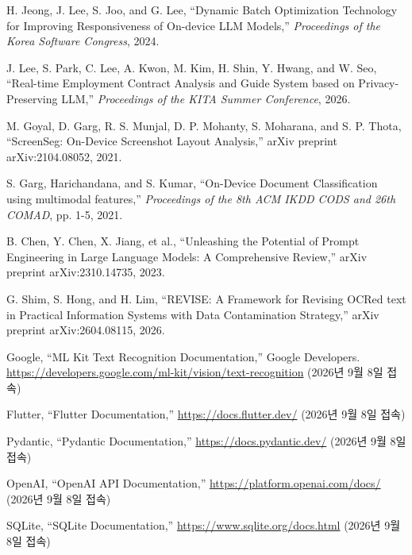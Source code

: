 \documentclass[11pt,a4paper]{article}
\begin{document}
\begin{enumerate}[label={[\arabic*]}]
    \item\label{ref_ondevice_llm} H. Jeong, J. Lee, S. Joo, and G. Lee,
    ``Dynamic Batch Optimization Technology for Improving Responsiveness of On-device LLM Models,''
    \textit{Proceedings of the Korea Software Congress}, 2024.

    \item\label{ref_privacy_llm} J. Lee, S. Park, C. Lee, A. Kwon, M. Kim, H. Shin, Y. Hwang, and W. Seo,
    ``Real-time Employment Contract Analysis and Guide System based on Privacy-Preserving LLM,''
    \textit{Proceedings of the KITA Summer Conference}, 2026.

    \item\label{ref_screenseg} M. Goyal, D. Garg, R. S. Munjal, D. P. Mohanty, S. Moharana, and S. P. Thota,
    ``ScreenSeg: On-Device Screenshot Layout Analysis,''
    arXiv preprint arXiv:2104.08052, 2021.

    \item\label{ref_ondevice_classification} S. Garg, Harichandana, and S. Kumar,
    ``On-Device Document Classification using multimodal features,''
    \textit{Proceedings of the 8th ACM IKDD CODS and 26th COMAD}, pp. 1-5, 2021.

    \item\label{ref_prompt_engineering} B. Chen, Y. Chen, X. Jiang, et al.,
    ``Unleashing the Potential of Prompt Engineering in Large Language Models: A Comprehensive Review,''
    arXiv preprint arXiv:2310.14735, 2023.

    \item\label{ref_revise} G. Shim, S. Hong, and H. Lim,
    ``REVISE: A Framework for Revising OCRed text in Practical Information Systems with Data Contamination Strategy,''
    arXiv preprint arXiv:2604.08115, 2026.

    \item\label{ref_mlkit} Google,
    ``ML Kit Text Recognition Documentation,''
    Google Developers.
    \url{https://developers.google.com/ml-kit/vision/text-recognition} (2026년 9월 8일 접속)

    \item\label{ref_flutter} Flutter,
    ``Flutter Documentation,''
    \url{https://docs.flutter.dev/} (2026년 9월 8일 접속)

    \item\label{ref_pydantic} Pydantic,
    ``Pydantic Documentation,''
    \url{https://docs.pydantic.dev/} (2026년 9월 8일 접속)

    \item\label{ref_openai} OpenAI,
    ``OpenAI API Documentation,''
    \url{https://platform.openai.com/docs/} (2026년 9월 8일 접속)

    \item\label{ref_sqlite} SQLite,
    ``SQLite Documentation,''
    \url{https://www.sqlite.org/docs.html} (2026년 9월 8일 접속)
\end{enumerate}

\newpage
\end{document}
